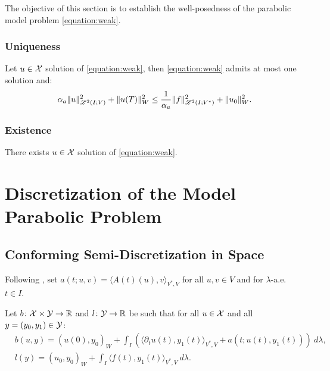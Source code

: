 The objective of this section is to establish the well-posedness of the parabolic model problem \eqref{equation:weak}.

\subsubsection{Uniqueness}

\begin{lemma}
    Let $u \in \mathcal{X}$ solution of \eqref{equation:weak}, then \eqref{equation:weak} admits at most one solution and:
    \begin{gather}
        \alpha_{a} \lVert u \rVert_{\mathscr{L}^{2}(I; V)}^2 + \lVert u(T) \rVert_W^2 \leq \frac{1}{\alpha_{a}} \lVert f \rVert_{\mathscr{L}^{2}(I; V^*)}^2 + \lVert u_0 \rVert_W^2.
    \end{gather}
\end{lemma}



\subsubsection{Existence}

\begin{lemma}[Existence]
    There exists $u \in \mathcal{X}$ solution of \eqref{equation:weak}.
\end{lemma}


\newpage
\section{Discretization of the Model Parabolic Problem}

\subsection{Conforming Semi-Discretization in Space}

Following \cite[p. 135]{Ern2021}, set $a(t; u, v) = \langle A(t)(u), v \rangle_{V^*, V}$ for all $u, v \in V$ and for $\lambda$-a.e. $t \in I$.

\begin{definition}[$b$ and $l$]
    Let $b \colon \mathcal{X} \times \mathcal{Y} \rightarrow \mathbb{R}$ and $l \colon \mathcal{Y} \rightarrow \mathbb{R}$ be such that for all $u \in \mathcal{X}$ and all $y = (y_0, y_1) \in \mathcal{Y}$:
    \begin{align}
        & b(u, y) = \left( u(0), y_0 \right)_W + \int_I \left( \langle \partial_t u(t), y_1(t) \rangle_{V^*, V} + a(t; u(t), y_1(t)) \right)~ d \lambda, \\
        & l(y) = \left( u_0, y_0 \right)_W + \int_I \langle f(t), y_1(t) \rangle_{V^*, V} ~ d \lambda.
    \end{align}
\end{definition}

